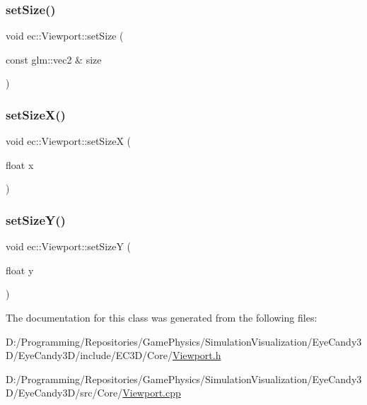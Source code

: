 \mbox{\label{classec_1_1_viewport_ad8e05ac01f4c19c599f6b7dc344b815c}} 
\subsubsection{\texorpdfstring{set\+Size()}{setSize()}\hspace{0.1cm}{\footnotesize\ttfamily [2/2]}}
{\footnotesize\ttfamily void ec\+::\+Viewport\+::set\+Size (\begin{DoxyParamCaption}\item[{const glm\+::vec2 \&}]{size }\end{DoxyParamCaption})}

\mbox{\label{classec_1_1_viewport_af1bcf1e3a8a06458c41a0c646b5f2057}} 
\subsubsection{\texorpdfstring{set\+Size\+X()}{setSizeX()}}
{\footnotesize\ttfamily void ec\+::\+Viewport\+::set\+SizeX (\begin{DoxyParamCaption}\item[{float}]{x }\end{DoxyParamCaption})}

\mbox{\label{classec_1_1_viewport_ae9420c066d2bf6f1a6cc5c0b65092862}} 
\subsubsection{\texorpdfstring{set\+Size\+Y()}{setSizeY()}}
{\footnotesize\ttfamily void ec\+::\+Viewport\+::set\+SizeY (\begin{DoxyParamCaption}\item[{float}]{y }\end{DoxyParamCaption})}



The documentation for this class was generated from the following files\+:\begin{DoxyCompactItemize}
\item 
D\+:/\+Programming/\+Repositories/\+Game\+Physics/\+Simulation\+Visualization/\+Eye\+Candy3\+D/\+Eye\+Candy3\+D/include/\+E\+C3\+D/\+Core/\mbox{\hyperlink{_viewport_8h}{Viewport.\+h}}\item 
D\+:/\+Programming/\+Repositories/\+Game\+Physics/\+Simulation\+Visualization/\+Eye\+Candy3\+D/\+Eye\+Candy3\+D/src/\+Core/\mbox{\hyperlink{_viewport_8cpp}{Viewport.\+cpp}}\end{DoxyCompactItemize}
